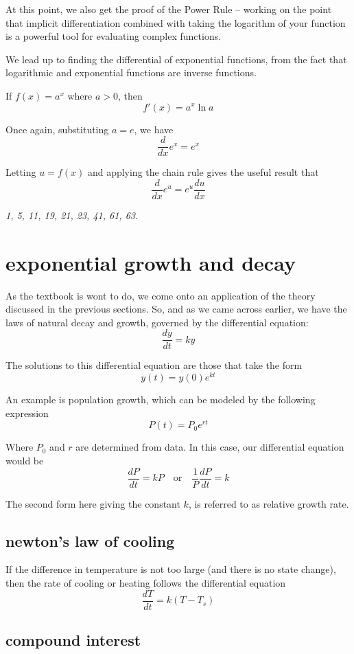 \documentclass[10pt,a4paper]{report}
\begin{document}
At this point, we also get the proof of the Power Rule -- working on the point that implicit differentiation combined with taking the logarithm of your function is a powerful tool for evaluating complex functions.

We lead up to finding the differential of exponential functions, from the fact that logarithmic and exponential functions are inverse functions.

If $f(x) = a^x$ where $a > 0$, then
$$
	f'(x) = a^x \ln a
$$

Once again, substituting $a = e$, we have
$$
	\frac{d}{dx} e^x = e^x
$$

Letting $u = f(x)$ and applying the chain rule gives the useful result that
$$
	\frac{d}{dx} e^u = e^u \frac{du}{dx}
$$

\emph{1, 5, 11, 19, 21, 23, 41, 61, 63.}

\section{exponential growth and decay}

As the textbook is wont to do, we come onto an application of the theory discussed in the previous sections. So, and as we came across earlier, we have the laws of natural decay and growth, governed by the differential equation:
$$
	\frac{dy}{dt} = ky
$$

The solutions to this differential equation are those that take the form
$$
	y(t) = y(0) e^{kt}
$$

An example is population growth, which can be modeled by the following expression
$$
	P(t) = P_0 e^{rt}
$$

Where $P_0$ and $r$ are determined from data. In this case, our differential equation would be
$$
	\frac{dP}{dt} = kP \quad \text{or} \quad \frac{1}{P}\frac{dP}{dt} = k
$$

The second form here giving the constant $k$, is referred to as relative growth rate.

\subsection{newton's law of cooling}

If the difference in temperature is not too large (and there is no state change), then the rate of cooling or heating follows the differential equation
$$
	\frac{dT}{dt} = k(T - T_s)
$$

\subsection{compound interest}
\end{document}
